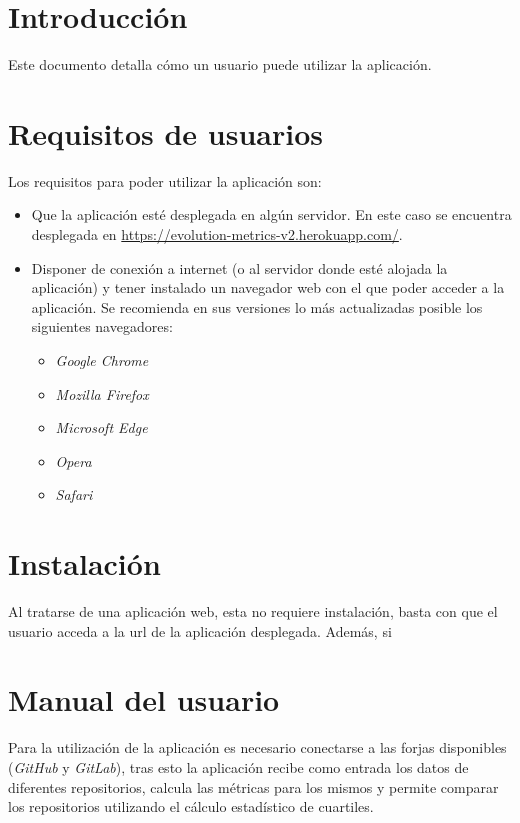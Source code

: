 \label{anex:D}

\section{Introducción}
Este documento detalla cómo un usuario puede utilizar la aplicación.
\section{Requisitos de usuarios}
Los requisitos para poder utilizar la aplicación son:
\begin{itemize}
	\tightlist
	\item Que la aplicación esté desplegada en algún servidor. En este caso se encuentra desplegada en \url{https://evolution-metrics-v2.herokuapp.com/}.
	\item Disponer de conexión a internet (o al servidor donde esté alojada la aplicación) y tener instalado un navegador web con el que poder acceder a la aplicación. Se recomienda en sus versiones lo más actualizadas posible los siguientes navegadores:
	\begin{itemize}
		\tightlist
		\item \textit{Google Chrome}
		\item \textit{Mozilla Firefox}
		\item \textit{Microsoft Edge}
		\item \textit{Opera}
		\item \textit{Safari}
	\end{itemize}
\end{itemize}

\section{Instalación}
Al tratarse de una aplicación web, esta no requiere instalación, basta con que el usuario acceda a la url de la aplicación desplegada. Además, si 

\section{Manual del usuario}
Para la utilización de la aplicación es necesario conectarse a las forjas disponibles (\textit{GitHub} y \textit{GitLab}), tras esto la aplicación recibe como entrada los datos de diferentes repositorios, calcula las métricas para los mismos y permite comparar los repositorios utilizando el cálculo estadístico de cuartiles.

